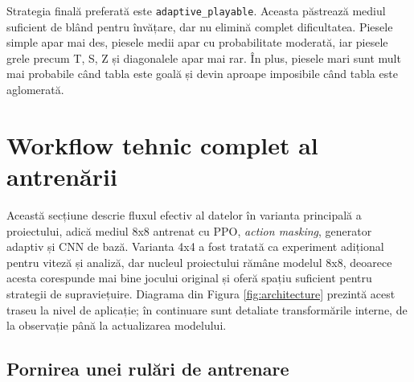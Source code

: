 \documentclass[12pt,a4paper]{article}
\begin{document}
Strategia finală preferată este \texttt{adaptive\_playable}. Aceasta păstrează mediul suficient de blând pentru învățare, dar nu elimină complet dificultatea. Piesele simple apar mai des, piesele medii apar cu probabilitate moderată, iar piesele grele precum T, S, Z și diagonalele apar mai rar. În plus, piesele mari sunt mult mai probabile când tabla este goală și devin aproape imposibile când tabla este aglomerată.

\begin{table}[H]
    \centering
    \caption{Comparație între generatoarele de seturi de piese testate.}
    \label{tab:generators}
\end{table}

\section{Workflow tehnic complet al antrenării}

Această secțiune descrie fluxul efectiv al datelor în varianta principală a proiectului, adică mediul 8x8 antrenat cu PPO, \textit{action masking}, generator adaptiv și CNN de bază. Varianta 4x4 a fost tratată ca experiment adițional pentru viteză și analiză, dar nucleul proiectului rămâne modelul 8x8, deoarece acesta corespunde mai bine jocului original și oferă spațiu suficient pentru strategii de supraviețuire. Diagrama din Figura \ref{fig:architecture} prezintă acest traseu la nivel de aplicație; în continuare sunt detaliate transformările interne, de la observație până la actualizarea modelului.

\subsection{Pornirea unei rulări de antrenare}
\end{document}
